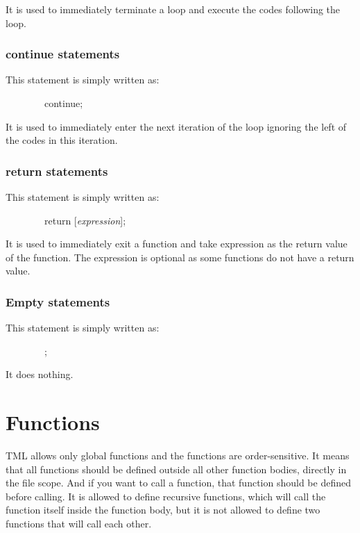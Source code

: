 \documentclass[12pt,psfig,a4]{article}
\begin{document}
It is used to immediately terminate a loop and execute the codes following the loop.

\subsubsection{continue statements}
This statement is simply written as:

\begin{code}
\begin{tabbing}
~~~~~~~~continue;
\end{tabbing}
\end{code}

It is used to immediately enter the next iteration of the loop ignoring the left of the codes in this iteration.

\subsubsection{return statements}
This statement is simply written as:

\begin{code}
\begin{tabbing}
~~~~~~~~return [\textsl{expression}];
\end{tabbing}
\end{code}

It is used to immediately exit a function and take expression as the return value of the function. The expression is optional as some functions do not have a return value.

\subsubsection{Empty statements}
This statement is simply written as:

\begin{code}
\begin{tabbing}
~~~~~~~~;
\end{tabbing}
\end{code}

It does nothing.


\section{Functions}
TML allows only global functions and the functions are order-sensitive. It means that all functions should be defined outside all other function bodies, directly in the file scope. And if you want to call a function, that function should be defined before calling. It is allowed to define recursive functions, which will call the function itself inside the function body, but it is not allowed to define two functions that will call each other.
\end{document}

